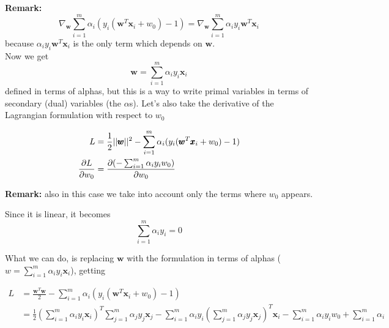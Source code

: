 \textbf{Remark:}
\[
	\nabla_{\pmb{w}}\sum_{i=1}^{m}\alpha_{i}(y_{i}(\pmb{w}^{T}\pmb{x}_{i}+ w_{0}) -
	1) = \nabla_{\pmb{w}}\sum_{i=1}^{m}\alpha_{i}y_{i}\pmb{w}^{T}\pmb{x}_{i}
\]
because $\alpha_{i}y_{i}\pmb{w}^{T}\pmb{x}_{i}$ is the only term which depends on
$\pmb{w}$. \\

Now we get
\begin{equation}
	\pmb{w}= \sum_{i=1}^{m}\alpha_{i}y_{i}\pmb{x}_{i}\label{ref:important_intermediate_result}
\end{equation}
defined in terms of alphas, but this is a way to write primal variables in terms
of secondary (dual) variables (the $\alpha$s). Let's also take the derivative of
the Lagrangian formulation with respect to $w_{0}$

\begin{align*}
	L            & = \frac{1}{2}||\pmb{w}||^{2}- \sum_{i=1}^{m}\alpha_{i}(y_{i}(\pmb{w}^{T}\pmb{x}_{i}+ w_{0}) - 1) \\
	\pdv{L}{w_0} & = \pdv{(- \sum_{i=1}^m \alpha_i y_i w_0)}{w_0}                                                   \\
\end{align*}

\textbf{Remark:} also in this case we take into account only the terms where $w_{0}$
appears.
\newline

Since it is linear, it becomes
\begin{equation}
	\sum_{i=1}^{m}\alpha_{i}y_{i}= 0 \label{ref:second important result}
\end{equation}

What we can do, is replacing $\pmb{w}$ with the formulation in terms of alphas ($w
= \sum_{i=1}^{m}\alpha_{i}y_{i}\pmb{x}_{i}$), getting

\begin{align*}
	L & = \frac{\pmb{w}^{T}\pmb{w}}{2}- \sum_{i=1}^{m}\alpha_{i}(y_{i}(\pmb{w}^{T}\pmb{x}_{i}+ w_{0}) - 1)                                                                                                                                                                 \\
	  & = \frac{1}{2}\left( \sum_{i=1}^{m}\alpha_{i}y_{i}\pmb{x}_{i}\right)^{T}{\sum_{j=1}^m \alpha_j y_j \pmb{x}_j}- \sum_{i=1}^{m}\alpha_{i}y_{i}(\sum_{j=1}^{m}\alpha_{j}y_{j}\pmb{x}_{j})^{T}\pmb{x}_{i}- \sum_{i=1}^{m}\alpha_{i}y_{i}w_{0}+ \sum_{i=1}^{m}\alpha_{i} \\
\end{align*}


